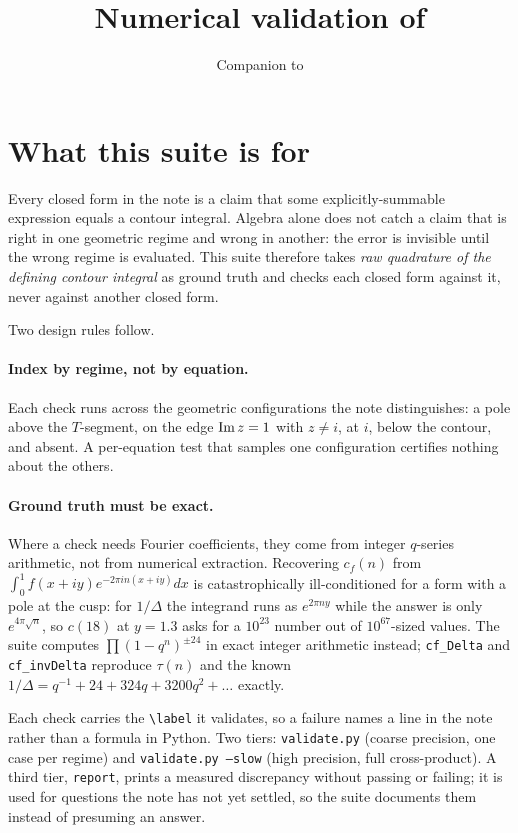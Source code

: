 \documentclass[11pt]{article}
\title{Numerical validation of \code{finite\_contour\_cocycles\_short.tex}}
\author{Companion to \code{validate.py}}
\date{}
\newcommand{\code}[1]{\texttt{#1}}
\begin{document}
\maketitle

\section{What this suite is for}

Every closed form in the note is a claim that some explicitly-summable expression equals a
contour integral. Algebra alone does not catch a claim that is right in one geometric regime
and wrong in another: the error is invisible until the wrong regime is evaluated. This suite
therefore takes \emph{raw quadrature of the defining contour integral} as ground truth and
checks each closed form against it, never against another closed form.

Two design rules follow.

\paragraph{Index by regime, not by equation.} Each check runs across the geometric
configurations the note distinguishes: a pole above the $T$-segment, on the edge
${\rm Im}\,z=1$ with $z\neq i$, at $i$, below the contour, and absent. A per-equation test that
samples one configuration certifies nothing about the others.

\paragraph{Ground truth must be exact.} Where a check needs Fourier coefficients, they come from
integer $q$-series arithmetic, not from numerical extraction. Recovering $c_f(n)$ from
$\int_0^1 f(x+iy)e^{-2\pi in(x+iy)}dx$ is catastrophically ill-conditioned for a form with a pole
at the cusp: for $1/\Delta$ the integrand runs as $e^{2\pi ny}$ while the answer is only
$e^{4\pi\sqrt n}$, so $c(18)$ at $y=1.3$ asks for a $10^{23}$ number out of $10^{67}$-sized
values. The suite computes $\prod(1-q^n)^{\pm24}$ in exact integer arithmetic instead;
\code{cf\_Delta} and \code{cf\_invDelta} reproduce $\tau(n)$ and the known
$1/\Delta=q^{-1}+24+324q+3200q^2+\dots$ exactly.

Each check carries the \verb|\label| it validates, so a failure names a line in the note rather
than a formula in Python. Two tiers: \code{validate.py} (coarse precision, one case per regime)
and \code{validate.py --slow} (high precision, full cross-product). A third tier,
\code{report}, prints a measured discrepancy without passing or failing; it is used for
questions the note has not yet settled, so the suite documents them instead of presuming an
answer.
\end{document}
